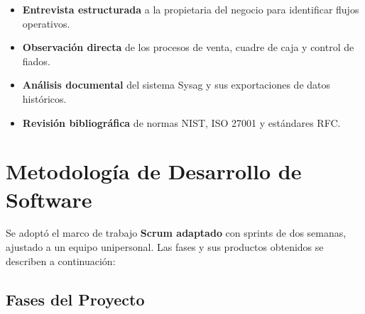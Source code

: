 \documentclass[12pt,a4paper,oneside]{report}
\begin{document}
\begin{itemize}[leftmargin=1.5cm]
  \item \textbf{Entrevista estructurada} a la propietaria del negocio para identificar flujos operativos.
  \item \textbf{Observación directa} de los procesos de venta, cuadre de caja y control de fiados.
  \item \textbf{Análisis documental} del sistema Sysag y sus exportaciones de datos históricos.
  \item \textbf{Revisión bibliográfica} de normas NIST, ISO 27001 y estándares RFC.
\end{itemize}

\section{Metodología de Desarrollo de Software}

Se adoptó el marco de trabajo \textbf{Scrum adaptado} con sprints de dos semanas, ajustado a un equipo unipersonal. Las fases y sus productos obtenidos se describen a continuación:

\subsection{Fases del Proyecto}
\end{document}
